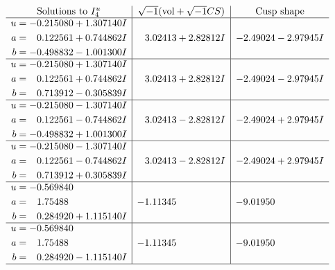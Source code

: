 \documentclass[1p]{elsarticle_modified}
\theoremstyle{definition}
\newcommand{\I}{\sqrt{-1}}
\begin{document}
$$\begin{array}{c|c|c}  
\text{Solutions to }I^u_{4}& \I (\text{vol} + \sqrt{-1}CS) & \text{Cusp shape}\\
 \hline 
\begin{aligned}
u &= -0.215080 + 1.307140 I \\
a &= \phantom{-}0.122561 + 0.744862 I \\
b &= -0.498832 - 1.001300 I\end{aligned}
 & \phantom{-}3.02413 + 2.82812 I & -2.49024 - 2.97945 I \\ \hline\begin{aligned}
u &= -0.215080 + 1.307140 I \\
a &= \phantom{-}0.122561 + 0.744862 I \\
b &= \phantom{-}0.713912 - 0.305839 I\end{aligned}
 & \phantom{-}3.02413 + 2.82812 I & -2.49024 - 2.97945 I \\ \hline\begin{aligned}
u &= -0.215080 - 1.307140 I \\
a &= \phantom{-}0.122561 - 0.744862 I \\
b &= -0.498832 + 1.001300 I\end{aligned}
 & \phantom{-}3.02413 - 2.82812 I & -2.49024 + 2.97945 I \\ \hline\begin{aligned}
u &= -0.215080 - 1.307140 I \\
a &= \phantom{-}0.122561 - 0.744862 I \\
b &= \phantom{-}0.713912 + 0.305839 I\end{aligned}
 & \phantom{-}3.02413 - 2.82812 I & -2.49024 + 2.97945 I \\ \hline\begin{aligned}
u &= -0.569840\phantom{ +0.000000I} \\
a &= \phantom{-}1.75488\phantom{ +0.000000I} \\
b &= \phantom{-}0.284920 + 1.115140 I\end{aligned}
 & -1.11345\phantom{ +0.000000I} & -9.01950\phantom{ +0.000000I} \\ \hline\begin{aligned}
u &= -0.569840\phantom{ +0.000000I} \\
a &= \phantom{-}1.75488\phantom{ +0.000000I} \\
b &= \phantom{-}0.284920 - 1.115140 I\end{aligned}
 & -1.11345\phantom{ +0.000000I} & -9.01950\phantom{ +0.000000I}\\
 \hline 
 \end{array}$$\newpage\newpage\renewcommand{\arraystretch}{1}
\end{document}
